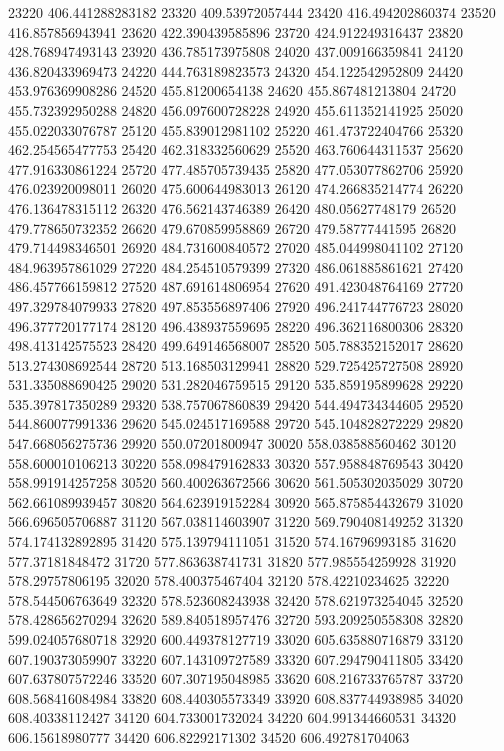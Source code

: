 {23220 406.441288283182
23320 409.53972057444
23420 416.494202860374
23520 416.857856943941
23620 422.390439585896
23720 424.912249316437
23820 428.768947493143
23920 436.785173975808
24020 437.009166359841
24120 436.820433969473
24220 444.763189823573
24320 454.122542952809
24420 453.976369908286
24520 455.81200654138
24620 455.867481213804
24720 455.732392950288
24820 456.097600728228
24920 455.611352141925
25020 455.022033076787
25120 455.839012981102
25220 461.473722404766
25320 462.254565477753
25420 462.318332560629
25520 463.760644311537
25620 477.916330861224
25720 477.485705739435
25820 477.053077862706
25920 476.023920098011
26020 475.600644983013
26120 474.266835214774
26220 476.136478315112
26320 476.562143746389
26420 480.05627748179
26520 479.778650732352
26620 479.670859958869
26720 479.58777441595
26820 479.714498346501
26920 484.731600840572
27020 485.044998041102
27120 484.963957861029
27220 484.254510579399
27320 486.061885861621
27420 486.457766159812
27520 487.691614806954
27620 491.423048764169
27720 497.329784079933
27820 497.853556897406
27920 496.241744776723
28020 496.377720177174
28120 496.438937559695
28220 496.362116800306
28320 498.413142575523
28420 499.649146568007
28520 505.788352152017
28620 513.274308692544
28720 513.168503129941
28820 529.725425727508
28920 531.335088690425
29020 531.282046759515
29120 535.859195899628
29220 535.397817350289
29320 538.757067860839
29420 544.494734344605
29520 544.860077991336
29620 545.024517169588
29720 545.104828272229
29820 547.668056275736
29920 550.07201800947
30020 558.038588560462
30120 558.600010106213
30220 558.098479162833
30320 557.958848769543
30420 558.991914257258
30520 560.400263672566
30620 561.505302035029
30720 562.661089939457
30820 564.623919152284
30920 565.875854432679
31020 566.696505706887
31120 567.038114603907
31220 569.790408149252
31320 574.174132892895
31420 575.139794111051
31520 574.16796993185
31620 577.37181848472
31720 577.863638741731
31820 577.985554259928
31920 578.29757806195
32020 578.400375467404
32120 578.42210234625
32220 578.544506763649
32320 578.523608243938
32420 578.621973254045
32520 578.428656270294
32620 589.840518957476
32720 593.209250558308
32820 599.024057680718
32920 600.449378127719
33020 605.635880716879
33120 607.190373059907
33220 607.143109727589
33320 607.294790411805
33420 607.637807572246
33520 607.307195048985
33620 608.216733765787
33720 608.568416084984
33820 608.440305573349
33920 608.837744938985
34020 608.40338112427
34120 604.733001732024
34220 604.991344660531
34320 606.15618980777
34420 606.82292171302
34520 606.492781704063
}
